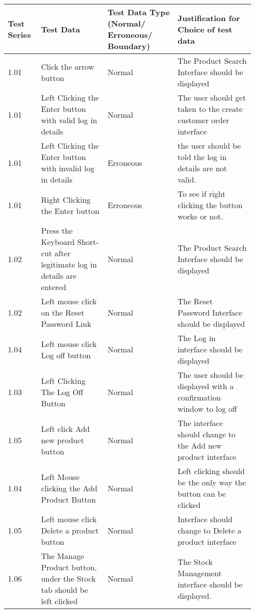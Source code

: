 	\begin{flushleft}
    \begin{longtable}{|p{1.5cm}|p{2.5cm}|p{2cm}|p{4.5cm}|}
        \hline
        \textbf{Test Series} & \textbf{Test Data} & \textbf{Test Data Type (Normal/ Erroneous/ Boundary)} &  \textbf{Justification for Choice of test data}\\ \hline
	\rowcolor{dark-grey}1.01 & Click the arrow button & Normal & The Product Search Interface should be displayed  \\ \hline
	\rowcolor{light-grey}1.01 & Left Clicking the Enter button with valid log in details & Normal & The user should get taken to the create customer order interface \\ \hline
	\rowcolor{light-grey}1.01 & Left Clicking the Enter button with invalid log in details & Erroneous & the user should be told the log in details are not valid. \\ \hline
	\rowcolor{light-grey}1.01 & Right Clicking the Enter button & Erroneous & To see if right clicking the button works or not. \\ \hline
	\rowcolor{dark-grey}1.02 & Press the Keyboard Short-cut after legitimate log in details are entered &  Normal & The Product Search Interface should be displayed \\ \hline
	1.02 & Left mouse click on the Reset Password Link &  Normal & The Reset Password Interface should be displayed  \\ \hline
	\rowcolor{dark-grey}1.04 & Left mouse click Log off button &  Normal & The Log in interface should be displayed  \\ \hline
	\rowcolor{light-grey}1.03 & Left Clicking The Log Off Button &  Normal & The user should be displayed with a confirmation window to log off  \\ \hline
	\rowcolor{dark-grey}1.05 & Left click Add new product button &  Normal &  The interface should change to the Add new product interface \\ \hline
	\rowcolor{light-grey}1.04 & Left Mouse clicking the Add Product Button &  Normal & Left clicking should be the only way the button can be clicked  \\ \hline
	1.05 &  Left mouse click Delete a product button &  Normal & Interface should change to Delete a product interface \\ \hline
	1.06 & The Manage Product button, under the Stock tab should be left clicked &  Normal & The Stock Management interface should be displayed.  \\ \hline

\end{longtable}
\end{flushleft}

